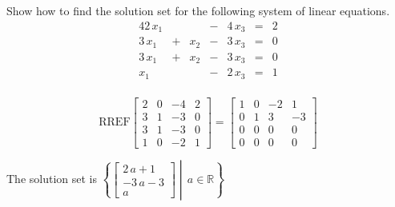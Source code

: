 
\begin{exerciseStatement}


Show how to find the solution set for the following system of linear equations. 
\begin{alignat*}{4} 2 \, x_{1} & &  &-& 4 \, x_{3} &=& 2 \\3 \, x_{1} &+& x_{2} &-& 3 \, x_{3} &=& 0 \\3 \, x_{1} &+& x_{2} &-& 3 \, x_{3} &=& 0 \\x_{1} & &  &-& 2 \, x_{3} &=& 1 \\ \end{alignat*}
            


\end{exerciseStatement}
    
\begin{exerciseAnswer} 
\[\mathrm{RREF} \left[\begin{array}{ccc|c}
2 & 0 & -4 & 2 \\
3 & 1 & -3 & 0 \\
3 & 1 & -3 & 0 \\
1 & 0 & -2 & 1
\end{array}\right]  =  \left[\begin{array}{ccc|c}
1 & 0 & -2 & 1 \\
0 & 1 & 3 & -3 \\
0 & 0 & 0 & 0 \\
0 & 0 & 0 & 0
\end{array}\right] \]

The solution set is \( \left\{ \left[\begin{array}{c}
2 \, a + 1 \\
-3 \, a - 3 \\
a
\end{array}\right] \middle|\,a\in\mathbb{R}\right\} \)


\end{exerciseAnswer}
    
